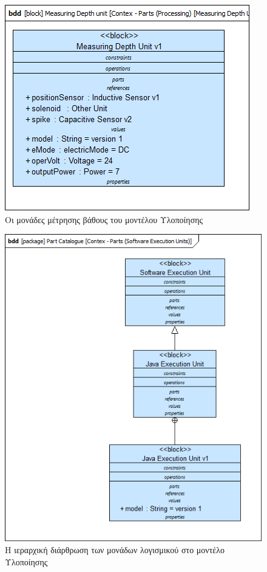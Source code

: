 \documentclass[a4paper,12pt,twoside]{report}
\begin{document}
\begin{appendices}
				\begin{figure}[hp]
					\centering
					\includegraphics[scale=0.50]{DesignModel_Contex-Parts(ProcessingUnits)[MeasuringDepthUnits].png}
					\caption{Οι μονάδες μέτρησης βάθους του μοντέλου Υλοποίησης}
					\label{φωτ:Οι μονάδες μέτρησης βάθους του μοντέλου Υλοποίησης}
				\end{figure}
				
				
				\begin{figure}[hp]
					\centering
					\includegraphics[scale=0.50]{DesignModel_Contex-Parts(SoftwareExecutionUnits).png}
					\caption{Η ιεραρχική διάρθρωση των μονάδων λογισμικού στο μοντέλο Υλοποίησης}
					\label{φωτ:Η ιεραρχική διάρθρωση των μονάδων λογισμικού στο μοντέλο Υλοποίησης}
				\end{figure}
				

\end{appendices}
\end{document}
